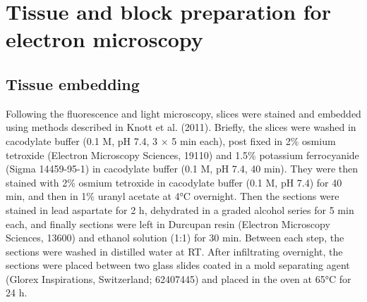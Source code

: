  \section{Tissue and block preparation for electron microscopy}
\label{sec:EM} 
\subsection{Tissue embedding}
\label{sec:tissue embedding}
Following the fluorescence and light microscopy, slices were stained and embedded using methods described in Knott et al. (2011). Briefly, the slices were washed in cacodylate buffer (0.1 M, pH 7.4, 3 × 5 min each), post fixed in 2\% osmium tetroxide (Electron Microscopy Sciences, 19110) and 1.5\% potassium ferrocyanide (Sigma 14459-95-1) in cacodylate buffer (0.1 M, pH 7.4, 40 min). They were then stained with 2\% osmium tetroxide in cacodylate buffer (0.1 M, pH 7.4) for 40 min, and then in 1\% uranyl acetate at 4°C overnight. Then the sections were stained in lead aspartate for 2 h, dehydrated in a graded alcohol series for 5 min each, and finally sections were left in Durcupan resin (Electron Microscopy Sciences, 13600) and ethanol solution (1:1) for 30 min. Between each step, the sections were washed in distilled water at RT. After infiltrating overnight, the sections were placed between two glass slides coated in a mold separating agent (Glorex Inspirations, Switzerland; 62407445) and placed in the oven at 65°C for 24 h. 
